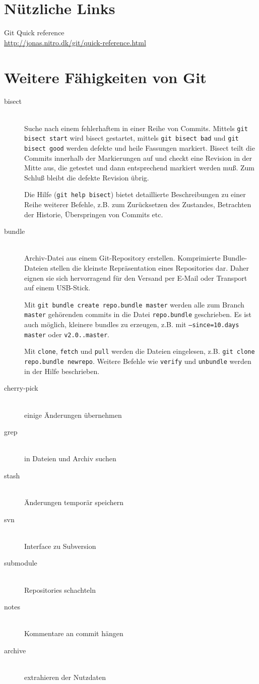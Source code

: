 \documentclass[a4paper, 12pt]{article}
\begin{document}
\newpage
\vfill
\section*{Nützliche Links}

Git Quick reference\\
\url{http://jonas.nitro.dk/git/quick-reference.html}


\section{Weitere Fähigkeiten von Git}

\begin{description}
  \item[bisect] \hfill \\
  Suche nach einem fehlerhaftem in einer Reihe von Commits. Mittels \texttt{git bisect start} wird bisect gestartet, mittels \texttt{git bisect bad} und \texttt{git bisect good} werden defekte und heile Fassungen markiert. Bisect teilt die Commits innerhalb der Markierungen auf und checkt eine Revision in der Mitte aus, die getestet und dann entsprechend markiert werden muß. Zum Schluß bleibt die defekte Revision übrig.
    
  Die Hilfe (\texttt{git help bisect}) bietet detaillierte Beschreibungen zu einer Reihe weiterer Befehle, z.B. zum Zurücksetzen des Zustandes, Betrachten der Historie, Überspringen von Commits etc.
  \item[bundle] \hfill \\
  Archiv-Datei aus einem Git-Repository erstellen. Komprimierte Bundle-Dateien stellen die kleinste Repräsentation eines Repositories dar. Daher eignen sie sich hervorragend für den Versand per E-Mail oder Transport auf einem USB-Stick. 
  
  Mit \texttt{git bundle create repo.bundle master} werden alle zum Branch \texttt{master} gehörenden commits in die Datei \texttt{repo.bundle} geschrieben. Es ist auch möglich, kleinere bundles zu erzeugen, z.B. mit \texttt{--since=10.days master} oder \texttt{v2.0..master}.
  
  Mit \texttt{clone}, \texttt{fetch} und \texttt{pull} werden die Dateien eingelesen, z.B. \texttt{git clone repo.bundle newrepo}. Weitere Befehle wie \texttt{verify} und \texttt{unbundle} werden in der Hilfe beschrieben.
  \item[cherry-pick] \hfill \\
  einige Änderungen übernehmen
  
  \item[grep] \hfill \\
  in Dateien und Archiv suchen
  \item[stash] \hfill \\
  Änderungen temporär speichern
  \item[svn] \hfill \\
  Interface zu Subversion

  \item[submodule] \hfill \\
	Repositories schachteln
  \item[notes] \hfill \\
  Kommentare an commit hängen
  \item[archive] \hfill \\
  extrahieren der Nutzdaten

  
  
  
\end{description}
\end{document}
